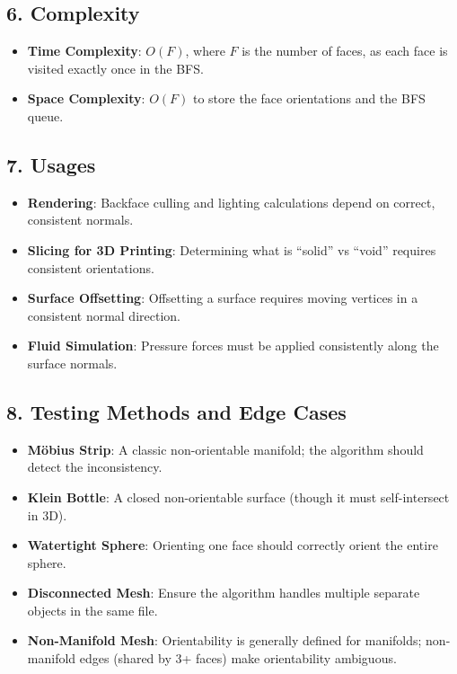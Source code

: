 \subsection{6. Complexity}

\begin{itemize}
    \item \textbf{Time Complexity}: $O(F)$, where $F$ is the number of faces, as each face is visited exactly once in the BFS.
    \item \textbf{Space Complexity}: $O(F)$ to store the face orientations and the BFS queue.
\end{itemize}

\subsection{7. Usages}

\begin{itemize}
    \item \textbf{Rendering}: Backface culling and lighting calculations depend on correct, consistent normals.
    \item \textbf{Slicing for 3D Printing}: Determining what is ``solid'' vs ``void'' requires consistent orientations.
    \item \textbf{Surface Offsetting}: Offsetting a surface requires moving vertices in a consistent normal direction.
    \item \textbf{Fluid Simulation}: Pressure forces must be applied consistently along the surface normals.
\end{itemize}

\subsection{8. Testing Methods and Edge Cases}

\begin{itemize}
    \item \textbf{M\"obius Strip}: A classic non-orientable manifold; the algorithm should detect the inconsistency.
    \item \textbf{Klein Bottle}: A closed non-orientable surface (though it must self-intersect in 3D).
    \item \textbf{Watertight Sphere}: Orienting one face should correctly orient the entire sphere.
    \item \textbf{Disconnected Mesh}: Ensure the algorithm handles multiple separate objects in the same file.
    \item \textbf{Non-Manifold Mesh}: Orientability is generally defined for manifolds; non-manifold edges (shared by 3+ faces) make orientability ambiguous.
\end{itemize}

